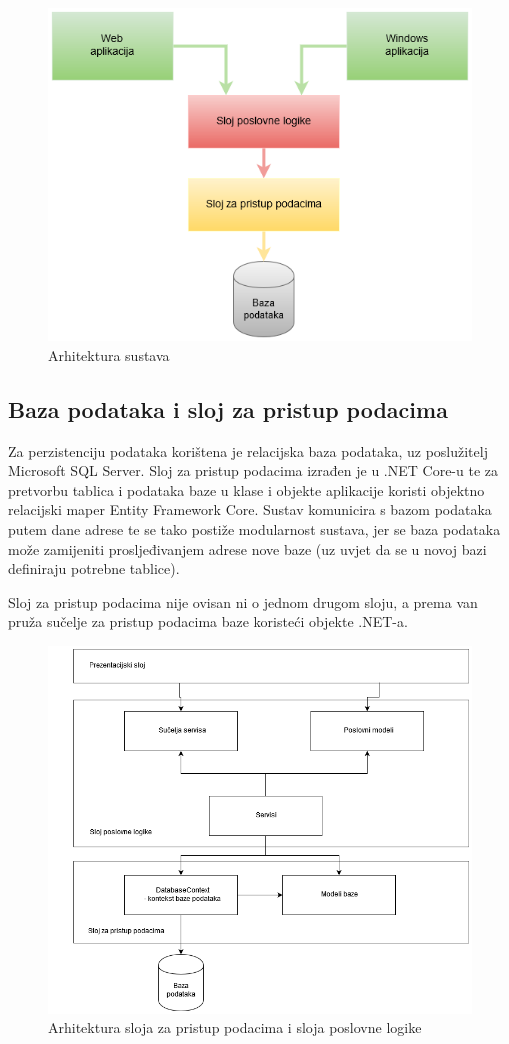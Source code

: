 \documentclass[times, utf8, diplomski]{fer}
\begin{document}
\begin{figure}[htb]
\centering
\includegraphics[width=12cm]{arh.png}
\caption{Arhitektura sustava}
\label{fig:arh}
\end{figure}

\subsection{Baza podataka i sloj za pristup podacima}
Za perzistenciju podataka korištena je relacijska baza podataka, uz poslužitelj Microsoft SQL Server.
Sloj za pristup podacima izrađen je u .NET Core-u te za pretvorbu tablica i podataka baze u klase i objekte aplikacije koristi objektno relacijski maper Entity Framework Core. 
Sustav komunicira s bazom podataka putem dane adrese  te se tako postiže modularnost sustava, jer se baza podataka može zamijeniti prosljeđivanjem adrese nove baze (uz uvjet da se u novoj bazi definiraju potrebne tablice).

Sloj za pristup podacima nije ovisan ni o jednom drugom sloju, a prema van pruža sučelje za pristup podacima baze koristeći objekte .NET-a. 

\begin{figure}[htb]
\centering
\includegraphics[width=12cm]{arhbig2.png}
\caption{Arhitektura sloja za pristup podacima i sloja poslovne logike}
\label{fig:arhbig}
\end{figure}
\end{document}
